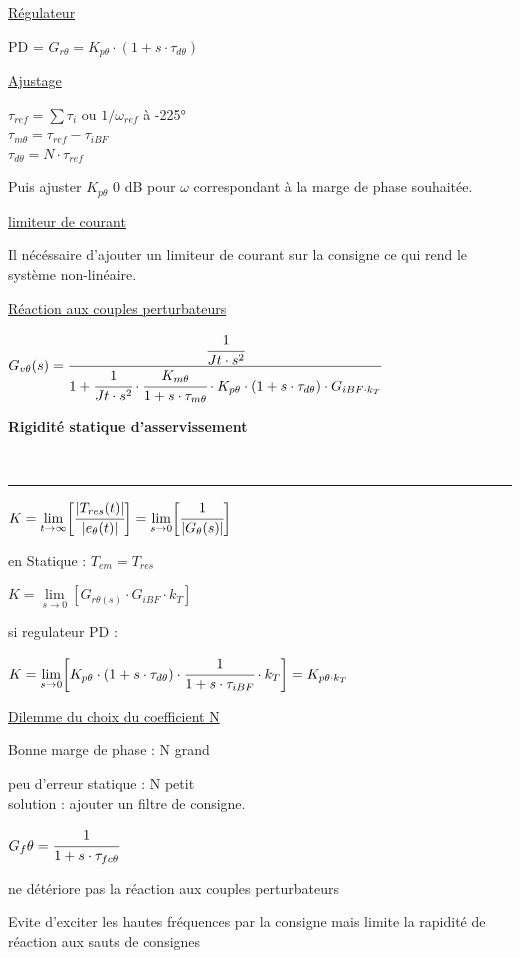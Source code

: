 \documentclass[	DIV=calc,%
							paper=a4,%
							fontsize=10pt,%
							twocolumn]{scrartcl} %
\newcounter{mycounter}
\newcommand{\formdesc}[1]{\large\textbf{#1} \addtocounter{mycounter}{1} \hfill \themycounter \\ \vspace{-3mm} \hrule \vspace{2mm}}
\begin{document}
\underline{Régulateur}

PD = $G_{r\theta} = K_{p\theta} \cdot (1+s\cdot\tau_{d\theta})$

\underline{Ajustage}

$\tau_{ref} = \sum\tau_i \text{ ou } 1/\omega_{ref} $ à -225°\\

$\tau_{m\theta} = \tau_{ref} - \tau_{iBF}$\\

$\tau_{d\theta} = N \cdot \tau_{ref}$

Puis ajuster $K_{p\theta}$ 0 dB pour $\omega$
correspondant à la marge de phase souhaitée.

\underline{limiteur de courant}

Il nécéssaire d'ajouter un limiteur de courant sur la consigne ce qui rend le système non-linéaire.


\underline{Réaction aux couples perturbateurs}

\resizebox{.5\textwidth}{!}
{
$G_{v\theta}(s) = \cfrac{\cfrac{1}{Jt \cdot s^2}}{1+\cfrac{1}{Jt \cdot s^2}\cdot \cfrac{K_{m\theta}}{1+s\cdot\tau_{m\theta}} \cdot K_{p\theta} \cdot (1+s\cdot\tau_{d\theta}) \cdot G_{iBF\cdot k_T}}$
}
\newpage


\formdesc{Rigidité statique d’asservissement}

$K = \lim\limits_{t \rightarrow \infty} \biggl[\cfrac{|T_{res}(t)|}{|e_\theta(t)|}\biggr] = \lim\limits_{s \rightarrow 0} \biggl[\cfrac{1}{|G_{\theta}(s)|}\biggr]$


en Statique : 
$T_{em} = T_{res}$

$K = \lim\limits_{s \rightarrow 0}[G_{r\theta(s)}\cdot G_{iBF}\cdot k_T]$

si regulateur PD : 

$K = \lim\limits_{s \rightarrow 0}\biggl[K_{p\theta} \cdot (1+s\cdot\tau_{d\theta}) \cdot \cfrac{1}{1+s\cdot\tau_{iBF}} \cdot k_T\biggr] = K_{p\theta \cdot k_T}$

\underline{Dilemme du choix du coefficient N}

Bonne marge de phase : N grand

peu d'erreur statique : N petit \\

solution : ajouter un filtre de consigne.

$G_f\theta = \cfrac{1}{1+s\cdot\tau_{fc\theta}}$

ne détériore pas la réaction aux couples perturbateurs

Evite d'exciter les hautes fréquences par la consigne mais limite la rapidité de réaction aux sauts de consignes
\end{document}
